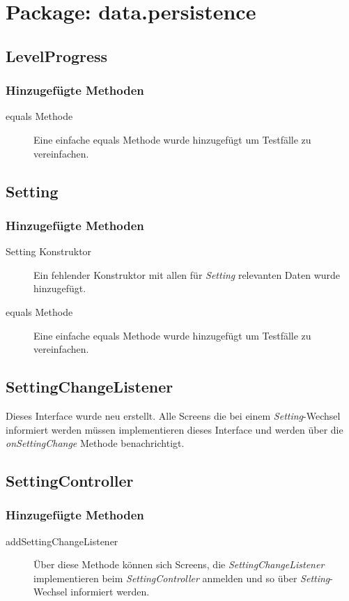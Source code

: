 \section{Package: data.persistence}

\subsection{LevelProgress}

\subsubsection{Hinzugefügte Methoden}
\begin{description}
\item[equals Methode]
Eine einfache equals Methode wurde hinzugefügt um Testfälle zu vereinfachen.
\end{description}

\subsection{Setting}
\subsubsection{Hinzugefügte Methoden}
\begin{description}
\item[Setting Konstruktor]
Ein fehlender Konstruktor mit allen für \emph{Setting} relevanten Daten wurde hinzugefügt.
\item[equals Methode]
Eine einfache equals Methode wurde hinzugefügt um Testfälle zu vereinfachen.

\end{description}

\subsection{SettingChangeListener}

Dieses Interface wurde neu erstellt. Alle Screens die bei einem  \emph{Setting}-Wechsel informiert werden müssen implementieren dieses Interface und werden über die \emph{onSettingChange} Methode benachrichtigt.


\subsection{SettingController}

\subsubsection{Hinzugefügte Methoden}
\begin{description}
\item[addSettingChangeListener]
Über diese Methode können sich Screens, die \emph{SettingChangeListener} implementieren beim \emph{SettingController} anmelden und so über \emph{Setting}-Wechsel informiert werden.
\end{description}


